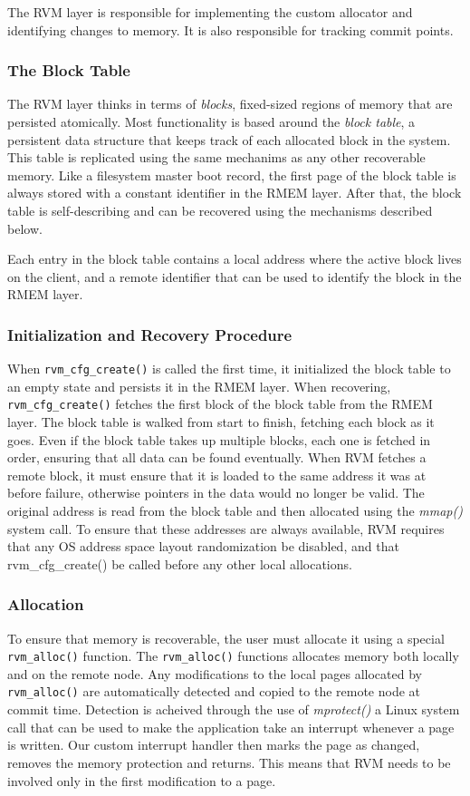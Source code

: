 The RVM layer is responsible for implementing the custom allocator and
identifying changes to memory. It is also responsible for tracking commit
points.

\subsubsection{The Block Table}
The RVM layer thinks in terms of \emph{blocks}, fixed-sized regions of
memory that are persisted atomically. Most functionality is based around the
\emph{block table}, a persistent data structure that keeps track of each
allocated block in the system. This table is replicated using the same
 mechanims as any other recoverable memory. Like a filesystem master boot record,
 the first page of the block table is always
stored with a constant identifier in the RMEM layer. After that, the block table
is self-describing and can be recovered using the mechanisms described below.

Each entry in the block table contains a local address where the active block
lives on the client, and a remote identifier that can be used to identify the
block in the RMEM layer. 

\subsubsection{Initialization and Recovery Procedure}
When \verb|rvm_cfg_create()| is called the first time, it initialized the
block table to an empty state and persists it in the RMEM layer. When
recovering, \verb|rvm_cfg_create()| fetches the first block of the block table from the
RMEM layer. The block table is walked from start to finish, fetching each block as it goes. Even if the block table takes up multiple blocks, each one is fetched in order, ensuring that all data
can be found eventually. When RVM fetches a remote block, it must ensure that it
is loaded to the same address it was at before failure, otherwise pointers in
the data would no longer be valid. The original address is read from the block
table and then allocated using the \emph{mmap()} system call. To ensure that
these addresses are always available, RVM requires that any OS address space
layout randomization be disabled, and that rvm_cfg_create() be called before any
other local allocations.

\subsubsection{Allocation}
To ensure that memory is recoverable, the user must allocate it using a special
\verb|rvm_alloc()| function. The \verb|rvm_alloc()| functions allocates memory both locally and on the remote
node. Any modifications to the local pages allocated by \verb|rvm_alloc()| are
automatically detected and copied to the remote node at commit time. Detection
is acheived through the use of \emph{mprotect()} a Linux system call that
can be used to make the application take an interrupt whenever a page is
written. Our custom interrupt handler then marks the page as changed, removes
the memory protection and returns. This means that RVM needs to be involved only
in the first modification to a page.

